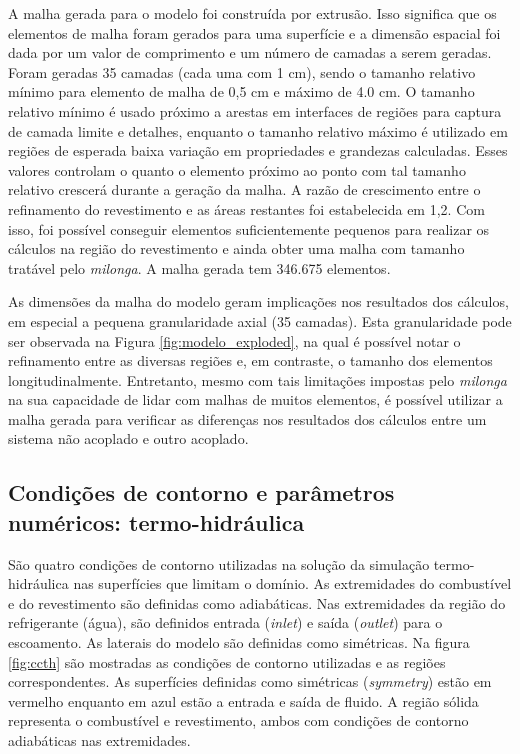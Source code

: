 A malha gerada para o modelo foi construída por extrusão. Isso significa que
os elementos de malha foram gerados para uma superfície e a dimensão espacial
foi dada por um valor de comprimento e um número de camadas a serem geradas.
Foram geradas 35 camadas (cada uma com 1 cm), sendo o tamanho relativo
mínimo para elemento de malha de 0,5 cm e máximo de 4.0 cm. O tamanho relativo
mínimo é usado próximo a arestas em interfaces de regiões para
captura de camada limite e detalhes, enquanto o tamanho relativo máximo é utilizado
em regiões de esperada baixa variação em propriedades e grandezas calculadas.
Esses valores controlam
o quanto o elemento próximo ao ponto com tal tamanho relativo crescerá durante
a geração da malha. A razão de crescimento entre o refinamento do revestimento
e as áreas restantes foi estabelecida em 1,2. Com isso, foi possível conseguir
elementos suficientemente pequenos para realizar os cálculos na região
do revestimento e ainda obter uma malha com tamanho tratável pelo \textit{milonga}.
A malha gerada tem 346.675 elementos.

As dimensões da malha do modelo geram implicações nos resultados dos cálculos, em
especial a pequena granularidade axial (35 camadas). Esta granularidade
pode ser observada na Figura \ref{fig:modelo_exploded},
na qual é possível notar
o refinamento entre as diversas regiões e, em contraste, o tamanho dos elementos longitudinalmente.
Entretanto, mesmo com tais
limitações impostas pelo \textit{milonga} na sua capacidade de lidar
com malhas de muitos elementos, é possível utilizar a malha gerada para verificar
as diferenças nos resultados dos cálculos entre um sistema não acoplado e outro acoplado.


\subsection{Condições de contorno e parâmetros numéricos: termo-hidráulica}
\label{subsec:ccth}


São quatro condições de contorno utilizadas na solução da simulação termo-hidráulica
nas superfícies que limitam o domínio. As extremidades do combustível e do revestimento
são definidas como adiabáticas. Nas
extremidades da região do refrigerante (água), são definidos entrada (\textit{inlet}) e
saída (\textit{outlet}) para o escoamento. As laterais do modelo são definidas
como simétricas. Na figura \ref{fig:ccth} são mostradas as condições de contorno
utilizadas e as regiões correspondentes. As superfícies definidas como simétricas (\textit{symmetry})
estão em vermelho
enquanto em azul estão a entrada e saída de fluido. A região sólida representa o
combustível e revestimento, ambos com condições de contorno adiabáticas nas extremidades.

